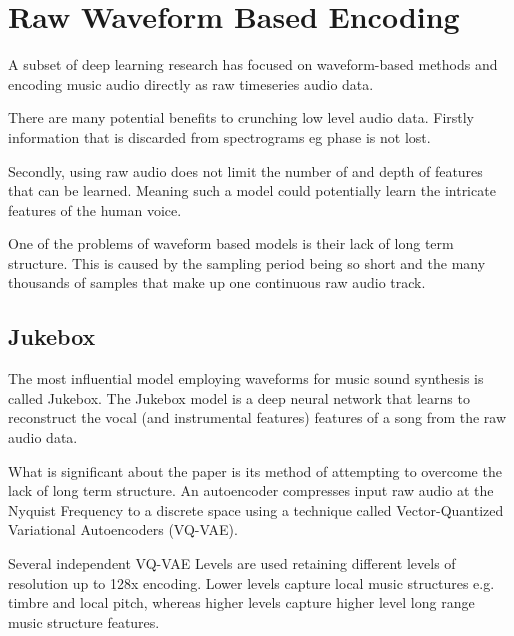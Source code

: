 \section{Raw Waveform Based Encoding}

A subset of deep learning research has focused on waveform-based methods and encoding music audio directly as raw timeseries audio data.

There are many potential benefits to crunching low level audio data. Firstly information that is discarded from spectrograms eg phase is not lost.

Secondly, using raw audio does not limit the number of and depth of features that can be learned. Meaning such a model could potentially learn the intricate features of the human voice.

One of the problems of waveform based models is their lack of long term structure. This is caused by the sampling period being so short and the many thousands of samples that make up one continuous raw audio track\cite{JukeboxWebsite}.

\subsection{Jukebox}

The most influential model employing waveforms for music sound synthesis is called Jukebox\cite{Jukebox}. The Jukebox model is a deep neural network that learns to reconstruct the vocal (and instrumental features) features of a song from the raw audio data.

What is significant about the paper is its method of attempting to overcome the lack of long term structure. An autoencoder compresses input raw audio at the Nyquist Frequency to a discrete space using a technique called Vector-Quantized Variational Autoencoders (VQ-VAE)\cite{Jukebox}.

\vspace{0.5cm}
\vspace{0.5cm}

Several independent VQ-VAE Levels are used retaining different levels of resolution up to 128x encoding. Lower levels capture local music structures e.g. timbre and local pitch, whereas higher levels capture higher level long range music structure features.

